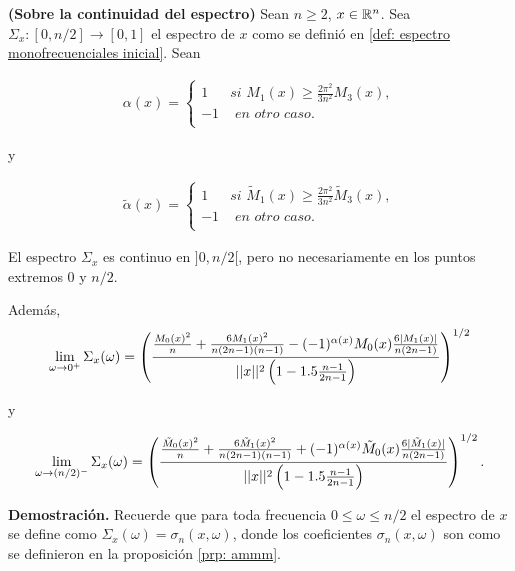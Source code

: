 \begin{teo}
\label{teo: limite del espectro por cero}
\textbf{(Sobre la continuidad del espectro)}
Sean $n \geq 2$, $x \in \mathbb{R}^{n}$.
Sea $\Sigma_{x}: [0, n/2] \rightarrow [0,1]$ el espectro de $x$ como se definió
en \ref{def: espectro monofrecuenciales inicial}.
Sean

\begin{align}
\label{ec: alpha}
\alpha(x)= \begin{cases}
1 & \textit{si } M_{1}(x) \geq \frac{2\pi^{2}}{3n^{2}}M_{3}(x), \\
-1 & \textit{ en otro caso}. \\
\end{cases}
\end{align}

y

\begin{align}
\label{ec: alpha tilde}
\tilde{\alpha}(x)= 
\begin{cases}
1 & \textit{si } \tilde{M}_{1}(x) \geq \frac{2\pi^{2}}{3n^{2}} \tilde{M}_{3}(x), \\
-1 & \textit{ en otro caso}. \\
\end{cases}
\end{align}


El espectro $\Sigma_{x}$ es continuo en $]0, n/2[$, pero no 
necesariamente en los puntos extremos $0$ y $n/2$.

Además,
\begin{equation}
\label{eq: limite del espectro a cero}
\lim\limits_{\omega \rightarrow 0^{+}}{\Sigma_{x}(\omega)}
=
\left(
\frac{
\frac{M_{0}(x)^{2}}{n} + \frac{6M_{1}(x)^{2}}{n(2n-1)(n-1)}
- (-1)^{\alpha(x)}M_{0}(x) \frac{6 |M_{1}(x)|}{n(2n-1	)}
}{
||x||^{2} \left(
1- 1.5 \frac{n-1}{2n-1}
\right)
}
\right)^{1/2}
\end{equation}

y

\begin{equation}
\label{eq: limite del espectro a cero}
\lim\limits_{\omega \rightarrow (n/2)^{-}}{\Sigma_{x}(\omega)}
=
\left(
\frac{
\frac{\tilde{M}_{0}(x)^{2}}{n} + \frac{6\tilde{M}_{1}(x)^{2}}{n(2n-1)(n-1)}
+(-1)^{\alpha(x)}\tilde{M}_{0}(x) \frac{6 |\tilde{M}_{1}(x)|}{n(2n-1)}
}{
||x||^{2} \left(
1- 1.5 \frac{n-1}{2n-1}
\right)
}
\right)^{1/2}.
\end{equation}
\end{teo}
\noindent
\textbf{Demostración.}
Recuerde que
para toda frecuencia
$0 \leq \omega \leq n/2$
el espectro de $x$ se define como 
$\Sigma_{x}(\omega) = \sigma_{n} (x, \omega)$,
donde los coeficientes
$\sigma_{n} (x, \omega)$ son como se definieron en
la proposición \ref{prp: ammm}.


